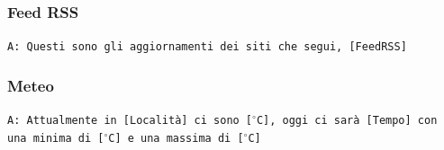 \subsubsection{Feed RSS}
\texttt{A: Questi sono gli aggiornamenti dei siti che segui, [FeedRSS]}

\subsubsection{Meteo}
\texttt{A: Attualmente in [Località] ci sono [$^\circ$C], oggi ci sarà [Tempo] con una minima di [$^\circ$C] e una massima di [$^\circ$C]}

